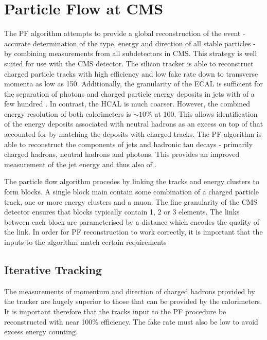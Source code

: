 \section{Particle Flow at \ac{CMS}}
The \ac{PF} algorithm \cite{cms_pf_pas} attempts to provide a global
reconstruction of the event - accurate determination of the type, energy and
direction of all stable particles - by combining measurements from all
subdetectors in \ac{CMS}. This strategy is well suited for use with the \ac{CMS}
detector. The silicon tracker is able to reconstruct charged particle tracks
with high efficiency and low fake rate down to transverse momenta as low as
\unit{150}{\MeV}. Additionally, the granularity of the \ac{ECAL} is sufficient
for the separation of photons and charged particle energy deposits in jets with
\Pt of a few hundred \GeV. In contrast, the \ac{HCAL} is much coarser. However,
the combined energy resolution of both calorimeters is $\sim 10\%$ at
\unit{100}{\GeV}. This allows identification of the energy deposits associated
with neutral hadrons as an excess on top of that accounted for by matching the
deposits with charged tracks. The \ac{PF} algorithm is able to reconstruct the
components of jets and hadronic tau decays - primarily charged hadrons, neutral
hadrons and photons. This provides an improved measurement of the jet energy and
thus also of \MET.

The particle flow algorithm procedes by linking the tracks and energy clusters
to form blocks. A single block main contain some combination of a charged
particle track, one or more energy clusters and a muon. The fine granularity of
the \ac{CMS} detector ensures that blocks typically contain 1, 2 or 3 elements.
The links between each block are parameterised by a distance which encodes the
quality of the link. In order for \ac{PF} reconstruction to work correctly, it
is important that the inputs to the algorithm match certain requirements

\subsection{Iterative Tracking}
The measurements of momentum and direction of charged hadrons provided by the
tracker are hugely superior to those that can be provided by the calorimeters.
It is important therefore that the tracks input to the \ac{PF} procedure be
reconstructed with near 100\% efficiency. The fake rate must also be low to
avoid excess energy counting.

